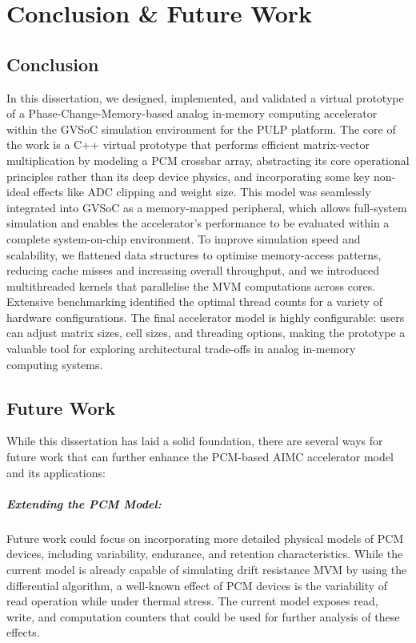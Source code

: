 \chapter{Conclusion \& Future Work}\label{chap:conclusion}
\section{Conclusion}\label{sec:res_sum}
In this dissertation, we designed, implemented, and validated a virtual prototype of a Phase-Change-Memory-based analog in-memory computing accelerator within the GVSoC simulation environment for the PULP platform. 
The core of the work is a C++ virtual prototype that performs efficient matrix-vector multiplication by modeling a PCM crossbar array, abstracting its core operational principles rather than its deep device physics, and incorporating some key non-ideal effects like ADC clipping and weight size.
This model was seamlessly integrated into GVSoC as a memory-mapped peripheral, which allows full-system simulation and enables the accelerator's performance to be evaluated within a complete system-on-chip environment. 
To improve simulation speed and scalability, we flattened data structures to optimise memory-access patterns, reducing cache misses and increasing overall throughput, and we introduced multithreaded kernels that parallelise the MVM computations across cores. 
Extensive benchmarking identified the optimal thread counts for a variety of hardware configurations. 
The final accelerator model is highly configurable: users can adjust matrix sizes, cell sizes, and threading options, making the prototype a valuable tool for exploring architectural trade-offs in analog in-memory computing systems.
\section{Future Work}\label{sec:future_work}
While this dissertation has laid a solid foundation, there are several ways for future work that can further enhance the PCM-based AIMC accelerator model and its applications:

\paragraph{Extending the PCM Model:} Future work could focus on incorporating more detailed physical models of PCM devices,
  including variability, endurance, and retention characteristics. While the current model is already capable of simulating drift resistance MVM by using the differential algorithm, a well-known effect of PCM devices is the variability of read operation while under thermal stress. The current model exposes read, write, and computation counters that could be used for further analysis of these effects.
  
